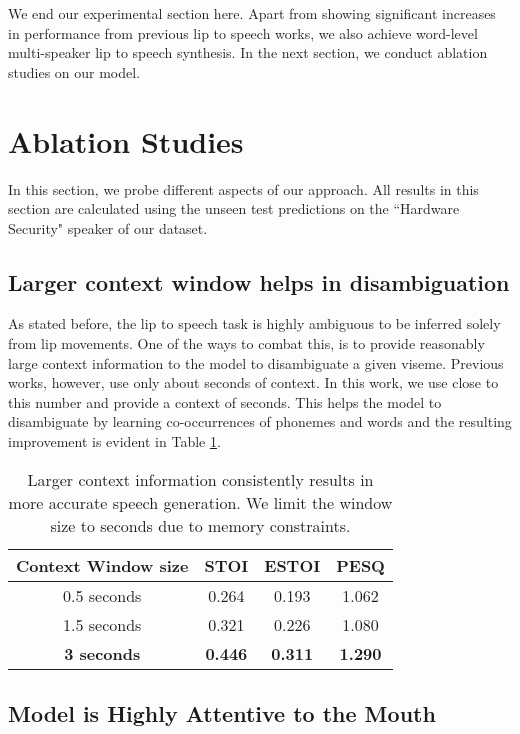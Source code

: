 \documentclass[10pt,twocolumn,letterpaper]{article}
\begin{document}
We end our experimental section here. Apart from showing significant increases in performance from previous lip to speech works, we also achieve word-level multi-speaker lip to speech synthesis. In the next section, we conduct ablation studies on our model.
\section{Ablation Studies}
\label{section:ablation}
In this section, we probe different aspects of our \modelname approach. All results in this section are calculated using the unseen test predictions on the ``Hardware Security" speaker of our \modelname dataset. 

\subsection{Larger context window helps in disambiguation}
\label{subsection:contextwindow}
As stated before, the lip to speech task is highly ambiguous to be inferred solely from lip movements. One of the ways to combat this, is to provide reasonably large context information to the model to disambiguate a given viseme. Previous works, however, use only about  seconds of context. In this work, we use close to  this number and provide a context of  seconds. This helps the model to disambiguate by learning co-occurrences of phonemes and words and the resulting improvement is evident in Table \ref{tab:contextwindows}. 
\begin{table}[h]
\centering
  \begin{tabular}{|c||c|c|c|}
    \hline
    Context Window size & STOI & ESTOI & PESQ \\
    \hline
    0.5 seconds & 0.264 & 0.193 & 1.062\\
    1.5 seconds & 0.321 & 0.226 & 1.080\\
    \textbf{3 seconds} &\textbf{0.446} & \textbf{0.311} & \textbf{1.290}\\
  \hline
\end{tabular}
    \vspace{.2cm}
    \caption{Larger context information consistently results in more accurate speech generation. We limit the window size to  seconds due to memory constraints.}
    \label{tab:contextwindows}
\end{table}

\subsection{Model is Highly Attentive to the Mouth}
\end{document}
